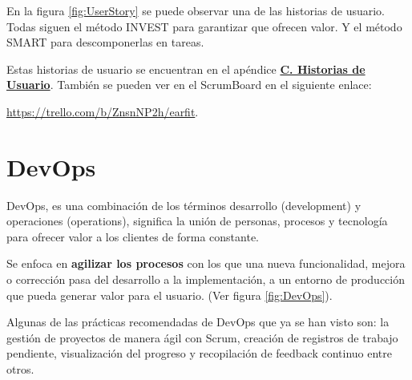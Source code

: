 \documentclass[12pt,twoside,titlepage]{report}
\begin{document}
En la figura \ref{fig:UserStory} se puede observar una de las historias de usuario. Todas siguen el método INVEST para garantizar que ofrecen valor. Y el método SMART para descomponerlas en tareas. \cite{invest}
 

Estas historias de usuario se encuentran en el apéndice \hyperref[sec:UserStories]{\textbf{C. Historias de Usuario}}. También se pueden ver en el ScrumBoard en el siguiente enlace: 

\url{https://trello.com/b/ZnsnNP2h/earfit}.


\section{DevOps}
\label{sec:DevOps}

DevOps, es una combinación de los términos desarrollo (development) y operaciones (operations), significa la unión de personas, procesos y tecnología para ofrecer valor a los clientes de forma constante.

Se enfoca en \textbf{agilizar los procesos} con los que una nueva funcionalidad, mejora o corrección pasa del desarrollo a la implementación, a un entorno de producción que pueda generar valor para el usuario.
(Ver figura \ref{fig:DevOps}).

Algunas de las prácticas recomendadas de DevOps que ya se han visto son: la gestión de proyectos de manera ágil con Scrum, creación de registros de trabajo pendiente, visualización del progreso y recopilación de feedback continuo entre otros.
\end{document}
